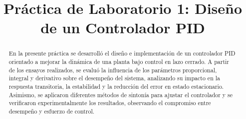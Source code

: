 \title{Práctica de Laboratorio 1: Diseño de un Controlador PID}
\author{
	\and
	\and
}

\maketitle

\begin{abstract}
	En la presente práctica se desarrolló el diseño e implementación de un controlador PID orientado a mejorar la dinámica de una planta bajo control en lazo cerrado. A partir de los ensayos realizados, se evaluó la influencia de los parámetros proporcional, integral y derivativo sobre el desempeño del sistema, analizando su impacto en la respuesta transitoria, la estabilidad y la reducción del error en estado estacionario. Asimismo, se aplicaron diferentes métodos de sintonía para ajustar el controlador y se verificaron experimentalmente los resultados, observando el compromiso entre desempeño y esfuerzo de control.
\end{abstract}



